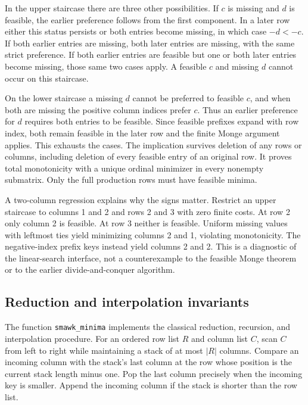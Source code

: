 In the upper staircase there are three other possibilities. If $c$ is missing and $d$ is feasible, the earlier preference follows from the first component. In a later row either this status persists or both entries become missing, in which case $-d<-c$. If both earlier entries are missing, both later entries are missing, with the same strict preference. If both earlier entries are feasible but one or both later entries become missing, those same two cases apply. A feasible $c$ and missing $d$ cannot occur on this staircase.

On the lower staircase a missing $d$ cannot be preferred to feasible $c$, and when both are missing the positive column indices prefer $c$. Thus an earlier preference for $d$ requires both entries to be feasible. Since feasible prefixes expand with row index, both remain feasible in the later row and the finite Monge argument applies. This exhausts the cases. The implication survives deletion of any rows or columns, including deletion of every feasible entry of an original row. It proves total monotonicity with a unique ordinal minimizer in every nonempty submatrix. Only the full production rows must have feasible minima.

A two-column regression explains why the signs matter. Restrict an upper staircase to columns 1 and 2 and rows 2 and 3 with zero finite costs. At row 2 only column 2 is feasible. At row 3 neither is feasible. Uniform missing values with leftmost ties yield minimizing columns 2 and 1, violating monotonicity. The negative-index prefix keys instead yield columns 2 and 2. This is a diagnostic of the linear-search interface, not a counterexample to the feasible Monge theorem or to the earlier divide-and-conquer algorithm.

\subsection{Reduction and interpolation invariants}
The function \texttt{smawk\_minima} implements the classical reduction, recursion, and interpolation procedure. For an ordered row list $R$ and column list $C$, scan $C$ from left to right while maintaining a stack of at most $|R|$ columns. Compare an incoming column with the stack's last column at the row whose position is the current stack length minus one. Pop the last column precisely when the incoming key is smaller. Append the incoming column if the stack is shorter than the row list.

